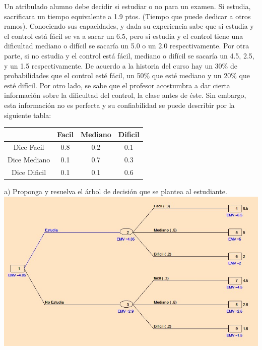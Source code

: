 \documentclass[spanish]{article}
\begin{document}
\begin{center}
\justify
Un atribulado alumno debe decidir si estudiar o no para un examen. Si estudia, sacrificara un tiempo equivalente a 1.9 ptos. (Tiempo que puede dedicar a otros ramos). Conociendo sus capacidades, y dada su experiencia sabe que si estudia y el control está fácil se va a sacar un 6.5, pero si estudia y el control tiene una dificultad mediano o difícil se sacaría un 5.0 o un 2.0 respectivamente. Por otra parte, si no estudia y el control está fácil, mediano o difícil se sacaría un 4.5, 2.5, y un 1.5 respectivamente.
De acuerdo a la historia del curso hay un 30\% de probabilidades que el control esté fácil, un 50\% que esté mediano y un 20\% que esté difícil.
Por otro lado, se sabe que el profesor acostumbra a dar cierta información sobre la dificultad del control, la clase antes de éste. Sin embargo, esta información no es perfecta y su confiabilidad se puede describir por la siguiente tabla: \\
\begin{center}
\begin{tabular}{ | c | c | c | c | }
 \hline
 & Facil & Mediano & Dificil \\ \hline
Dice Facil & 0.8 & 0.2 & 0.1 \\
Dice Mediano & 0.1 & 0.7 & 0.3 \\
Dice Dificil & 0.1 & 0.1 & 0.6 \\ \hline
\end{tabular}
\end{center}

\hspace{10mm} a) Proponga y resuelva el árbol de decisión que se plantea al estudiante.\\

\includegraphics[width=1.0\linewidth,height=0.3\textheight]{arbol2.jpg}\\


\end{center}
\end{document}
